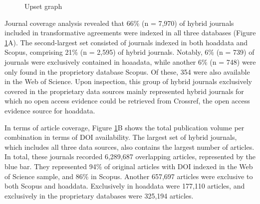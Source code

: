 \documentclass[a4paper,man,floatsintext,longtable,noextraspace,10pt]{apa6}
\begin{document}
\begin{figure}[ht!]


\caption{\label{fig-upset_coverage_results}Upset graph}

\end{figure}%

Journal coverage analysis revealed that 66\% (n = 7,970) of hybrid
journals included in transformative agreements were indexed in all three
databases (Figure \ref{fig-upset_coverage_results}A). The second-largest
set consisted of journals indexed in both hoaddata and Scopus,
comprising 21\% (n = 2,595) of hybrid journals. Notably, 6\% (n = 739)
of journals were exclusively contained in hoaadata, while another 6\% (n
= 748) were only found in the proprietory database Scopus. Of these, 354
were also available in the Web of Science. Upon inspection, this group
of hybrid journals exclusively covered in the proprietary data sources
mainly represented hybrid journals for which no open access evidence
could be retrieved from Crossref, the open access evidence source for
hoaddata.

In terms of article coverage, Figure \ref{fig-upset_coverage_results}B
shows the total publication volume per combination in terms of DOI
availability. The largest set of hybrid journals, which includes all
three data sources, also contains the largest number of articles. In
total, these journals recorded 6,289,687 overlapping articles,
represented by the blue bar. They represented 94\% of original articles
with DOI indexed in the Web of Science sample, and 86\% in Scopus.
Another 657,697 articles were exclusive to both Scopus and hoaddata.
Exclusively in hoaddata were 177,110 articles, and exclusively in the
proprietary databases were 325,194 articles.
\end{document}
